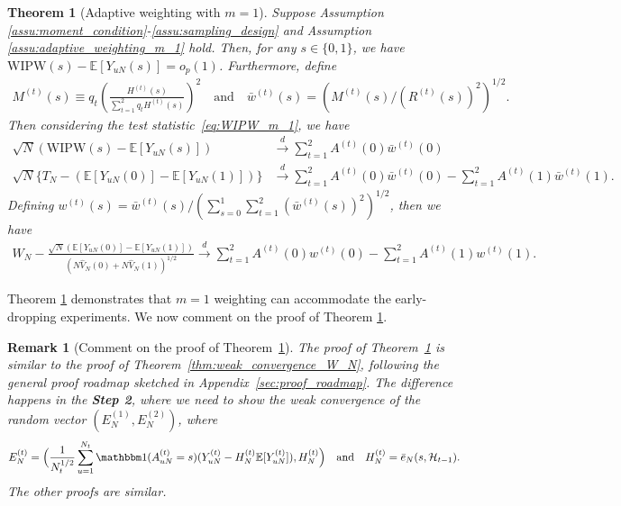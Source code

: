 \documentclass[12pt]{article}
\newtheorem{theorem}{Theorem}
\newtheorem{remark}{Remark}
\newcommand{\E}{\mathbb E}								%
\newcommand{\indicator}{\mathbbm 1}						%
\newcommand{\convd}{\overset d \rightarrow}             %
\newcommand{\WIPW}{\mathrm{WIPW}}
\begin{document}
\begin{theorem}[Adaptive weighting with $m=1$]\label{thm:weak_convergence_m_1}
	Suppose Assumption \ref{assu:moment_condition}-\ref{assu:sampling_design} and Assumption \ref{assu:adaptive_weighting_m_1} hold. Then, for any $s\in \{0,1\}$, we have $\WIPW(s)-\E[Y_{uN}(s)]=o_p(1)$. Furthermore, define 
	\begin{align*}
		M^{(t)}(s)\equiv q_t\left(\frac{H^{(t)}(s)}{\sum_{t=1}^2 q_t H^{(t)}(s)}\right)^2\quad\text{and}\quad\bar w^{(t)}(s)=\left(M^{(t)}(s)/(R^{(t)}(s))^2\right)^{1/2}.
	\end{align*}
	Then considering the test statistic~\eqref{eq:WIPW_m_1}, we have
	\begin{align*}
		\sqrt{N}(\WIPW(s)-\E[Y_{uN}(s)])
		&
		\convd \sum_{t=1}^2 A^{(t)}(0) \bar w^{(t)}(0)\\
		\sqrt{N}\{T_N-(\E[Y_{uN}(0)]-\E[Y_{uN}(1)])\}
		&
		\convd\sum_{t=1}^2 A^{(t)}(0) \bar w^{(t)}(0) -\sum_{t=1}^2 A^{(t)}(1) \bar w^{(t)}(1).
	\end{align*}
	Defining $w^{(t)}(s)=\bar w^{(t)}(s)/(\sum_{s=0}^1\sum_{t=1}^2 (\bar w^{(t)}(s))^2)^{1/2}$, then we have 
	\begin{align*}
		W_N-\frac{\sqrt{N}(\E[Y_{uN}(0)]-\E[Y_{uN}(1)])}{(N\hat{V}_N(0)+N\hat{V}_N(1))^{1/2}}\convd\sum_{t=1}^2 A^{(t)}(0) w^{(t)}(0) -\sum_{t=1}^2 A^{(t)}(1) w^{(t)}(1).		
	\end{align*}
\end{theorem}

\noindent Theorem \ref{thm:weak_convergence_m_1} demonstrates that $m=1$ weighting can accommodate the early-dropping experiments. We now comment on the proof of Theorem \ref{thm:weak_convergence_m_1}. 

\begin{remark}[Comment on the proof of Theorem~\ref{thm:weak_convergence_m_1}]
	The proof of Theorem~\ref{thm:weak_convergence_m_1} is similar to the proof of Theorem~\ref{thm:weak_convergence_W_N}, following the general proof roadmap sketched in Appendix~\ref{sec:proof_roadmap}. The difference happens in the \textbf{Step 2}, where we need to show the weak convergence of the random vector $(E_N^{(1)},E_{N}^{(2)})$, where
	\begin{align*}
		E_N^{(t)}=\Big(\frac{1}{N_t^{1/2}}\sum_{u=1}^{N_t} \indicator(A_{uN}^{(t)}=s)(Y_{uN}^{(t)}-H_N^{(t)}\E[Y_{uN}^{(t)}]),H_N^{(t)}\Big)\quad\text{and}\quad H_N^{(t)}=\bar e_N(s,\mathcal{H}_{t-1}).
	\end{align*}
	The other proofs are similar.
\end{remark}
\end{document}
